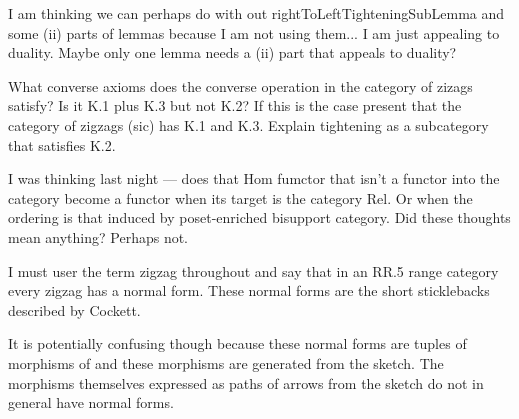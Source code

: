 \begin{aside}
I am thinking we can perhaps do with out rightToLeftTighteningSubLemma and some (ii) parts of lemmas because I am not using them... I am just appealing to duality. Maybe only one lemma needs a (ii) part that appeals to duality?
\end{aside}

\begin{aside}
 What converse axioms does the converse operation in the category of zizags satisfy? Is it K.1 plus K.3 but not K.2? If this is the case 
present that the category of zigzags (sic) has K.1 and K.3. Explain tightening as a subcategory that satisfies K.2. 
\end{aside}

\begin{aside}
I was thinking last night --- does that Hom fumctor that isn't a functor into the category \Par become a functor when its target is the category Rel. Or when the ordering is that induced by poset-enriched bisupport category. Did these thoughts mean anything? Perhaps not.
\end{aside}



\begin{aside}
I must user the term zigzag throughout and say that in an RR.5 range category every zigzag has a normal form. These normal forms are the 
short sticklebacks described by Cockett. 

It is potentially confusing though because these normal forms are tuples of morphisms 
of \catcw and these morphisms are generated from the sketch. The morphisms themselves expressed as paths of arrows from the sketch do not in general have normal forms.

\end{aside}
